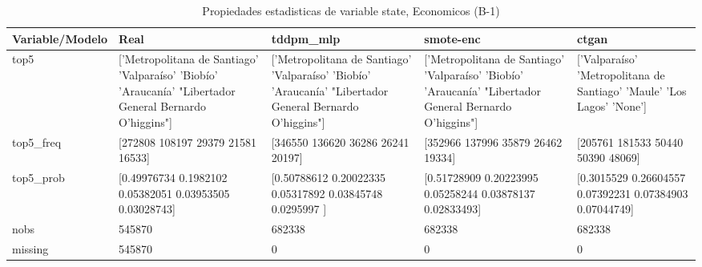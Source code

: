 \begin{table}[H]
\centering
\fontsize{8}{14}\selectfont
\caption{Propiedades  estadisticas de variable state, Economicos (B-1)}
\label{table-stats-economicos-b-1-state}
\begin{tabular}{|l|m{10em}|m{10em}|m{10em}|m{10em}|}
\hline
 \rowcolor[gray]{0.8}
Variable/Modelo & Real & tddpm\_mlp & smote-enc & ctgan \\
\hline top5 & ['Metropolitana de Santiago' 'Valparaíso' 'Biobío' 'Araucanía'
 "Libertador General Bernardo O'higgins"] & ['Metropolitana de Santiago' 'Valparaíso' 'Biobío' 'Araucanía'
 "Libertador General Bernardo O'higgins"] & ['Metropolitana de Santiago' 'Valparaíso' 'Biobío' 'Araucanía'
 "Libertador General Bernardo O'higgins"] & ['Valparaíso' 'Metropolitana de Santiago' 'Maule' 'Los Lagos' 'None'] \\
\hline top5\_freq & [272808 108197  29379  21581  16533] & [346550 136620  36286  26241  20197] & [352966 137996  35879  26462  19334] & [205761 181533  50440  50390  48069] \\
\hline top5\_prob & [0.49976734 0.1982102  0.05382051 0.03953505 0.03028743] & [0.50788612 0.20022335 0.05317892 0.03845748 0.0295997 ] & [0.51728909 0.20223995 0.05258244 0.03878137 0.02833493] & [0.3015529  0.26604557 0.07392231 0.07384903 0.07044749] \\
\hline nobs & 545870 & 682338 & 682338 & 682338 \\
\hline missing & 545870 & 0 & 0 & 0 \\
\hline
\end{tabular}
\end{table}
